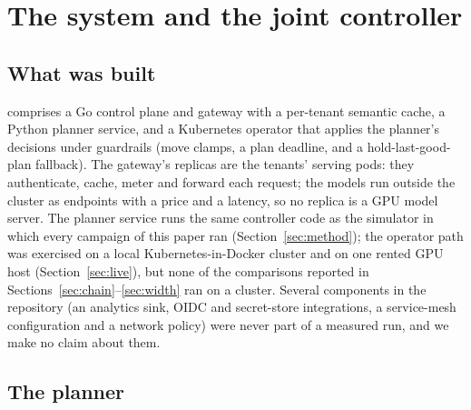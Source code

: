 \section{The system and the joint controller}
\label{sec:system}

\subsection{What was built}
\label{sec:built}

\polyforge{} comprises a Go control plane and gateway with a per-tenant
semantic cache, a Python planner service, and a Kubernetes operator that
applies the planner's decisions under guardrails (move clamps, a plan
deadline, and a hold-last-good-plan fallback). The gateway's replicas are
the tenants' serving pods: they authenticate, cache, meter and forward each
request; the models run outside the cluster as endpoints with a price and a
latency, so no replica is a GPU model server. The planner service runs the
same controller code as the simulator in which every campaign of this
paper ran (Section~\ref{sec:method}); the operator path was exercised on a
local Kubernetes-in-Docker cluster and on one rented GPU host
(Section~\ref{sec:live}), but none of the comparisons reported in
Sections~\ref{sec:chain}--\ref{sec:width} ran on a cluster. Several
components in the repository (an analytics sink, OIDC and secret-store
integrations, a service-mesh configuration and a network policy) were
never part of a measured run, and we make no claim about them.

\subsection{The planner}
\label{sec:jcac}

